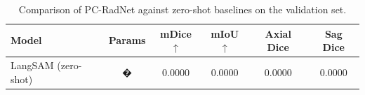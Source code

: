 ﻿\begin{table}[htbp]
\centering
\caption{Comparison of PC-RadNet against zero-shot baselines on the validation set.}
\label{tab:baselines}
\begin{tabular}{lccccc}
\toprule
Model & Params & mDice$\uparrow$ & mIoU$\uparrow$ & Axial Dice & Sag Dice \\
\midrule
LangSAM (zero-shot) & � & 0.0000 & 0.0000 & 0.0000 & 0.0000 \\
\bottomrule
\end{tabular}
\end{table}